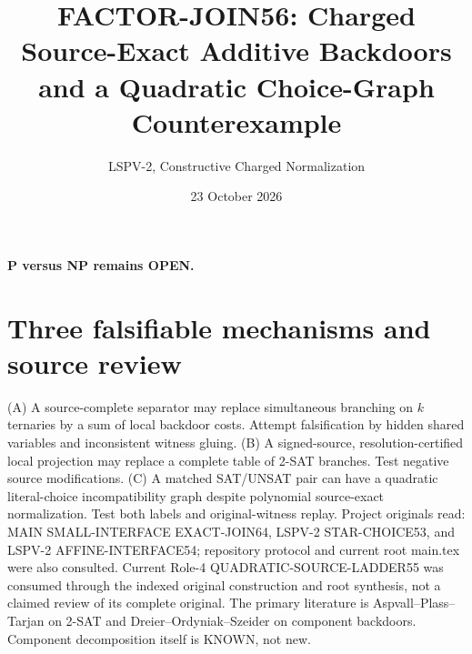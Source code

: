 \documentclass[11pt]{article}
\title{FACTOR-JOIN56: Charged Source-Exact Additive Backdoors and a Quadratic Choice-Graph Counterexample}
\author{LSPV-2, Constructive Charged Normalization}
\date{23 October 2026}
\begin{document}
\maketitle
\begin{center}\textbf{P versus NP remains OPEN.}\end{center}
\section{Three falsifiable mechanisms and source review}
(A) A source-complete separator may replace simultaneous branching on $k$ ternaries by a sum of local backdoor costs. Attempt falsification by hidden shared variables and inconsistent witness gluing. (B) A signed-source, resolution-certified local projection may replace a complete table of 2-SAT branches. Test negative source modifications. (C) A matched SAT/UNSAT pair can have a quadratic literal-choice incompatibility graph despite polynomial source-exact normalization. Test both labels and original-witness replay.
Project originals read: MAIN SMALL-INTERFACE EXACT-JOIN64, LSPV-2 STAR-CHOICE53, and LSPV-2 AFFINE-INTERFACE54; repository protocol and current root main.tex were also consulted. Current Role-4 QUADRATIC-SOURCE-LADDER55 was consumed through the indexed original construction and root synthesis, not a claimed review of its complete original. The primary literature is Aspvall--Plass--Tarjan on 2-SAT and Dreier--Ordyniak--Szeider on component backdoors. Component decomposition itself is KNOWN, not new.
\end{document}
